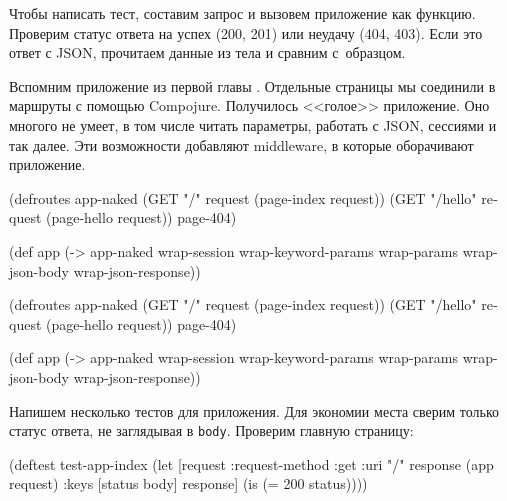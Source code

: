 Чтобы написать тест, составим запрос и вызовем приложение как функцию. Проверим
статус ответа на успех (200, 201) или неудачу (404, 403). Если это ответ с JSON,
прочитаем данные из тела и сравним с~образцом.

Вспомним приложение из первой главы . Отдельные страницы мы
соединили в маршруты с помощью Compojure. Получилось <<голое>> приложение. Оно
многого не умеет, в том числе читать параметры, работать с JSON, сессиями и так
далее. Эти возможности добавляют middleware, в которые оборачивают приложение.


\ifx\devicetype\mobile

\begin{english}
  \begin{clojure}
(defroutes app-naked
  (GET "/"
    request (page-index request))
  (GET "/hello"
    request (page-hello request))
  page-404)

(def app
  (-> app-naked
      wrap-session
      wrap-keyword-params
      wrap-params
      wrap-json-body
      wrap-json-response))
  \end{clojure}
\end{english}

\else

\begin{english}
  \begin{clojure}
(defroutes app-naked
  (GET "/"      request (page-index request))
  (GET "/hello" request (page-hello request))
  page-404)

(def app
  (-> app-naked
      wrap-session
      wrap-keyword-params
      wrap-params
      wrap-json-body
      wrap-json-response))
  \end{clojure}
\end{english}

\fi

Напишем несколько тестов для приложения. Для экономии места сверим только статус
ответа, не заглядывая в \verb|body|. Проверим главную страницу:

\ifx\devicetype\mobile

\begin{english}
  \begin{clojure}
(deftest test-app-index
  (let [request {:request-method :get
                 :uri "/"}
        response (app request)
        {:keys [status body]} response]
    (is (= 200 status))))
  \end{clojure}
\end{english}


